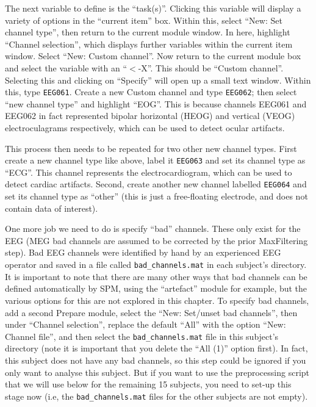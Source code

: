 The next variable to define is the ``task(s)''. Clicking this variable will display a variety of options in the ``current item'' box. Within this, select ``New: Set channel type'', then return to the current module window. In here, highlight ``Channel selection'', which displays further variables within the current item window. Select ``New: Custom channel''. Now return to the current module box and select the variable with an ``\(<\)-X''. This should be ``Custom channel''. Selecting this and clicking on ``Specify'' will open up a small text window. Within this, type \texttt{EEG061}. Create a new Custom channel and type \texttt{EEG062}; then select ``new channel type'' and highlight ``EOG''. This is because channels EEG061 and EEG062 in fact represented bipolar horizontal (HEOG) and vertical (VEOG) electroculagrams respectively, which can be used to detect ocular artifacts.

This process then needs to be repeated for two other new channel types. First create a new channel type like above, label it \texttt{EEG063} and set its channel type as ``ECG''. This channel represents the electrocardiogram, which can be used to detect cardiac artifacts. Second, create another new channel labelled \texttt{EEG064} and set its channel type as ``other'' (this is just a free-floating electrode, and does not contain data of interest).

One more job we need to do is specify ``bad'' channels. These only exist for the EEG (MEG bad channels are assumed to be corrected by the prior MaxFiltering step). Bad EEG channels were identified by hand by an experienced EEG operator and saved in a file called \texttt{bad\_channels.mat} in each subject's directory. It is important to note that there are many other ways that bad channels can be defined automatically by SPM, using the ``artefact'' module for example, but the various options for this are not explored in this chapter. To specify bad channels, add a second Prepare module, select the ``New: Set/unset bad channels'', then under ``Channel selection'', replace the default ``All'' with the option ``New: Channel file'', and then select the \texttt{bad\_channels.mat} file in this subject's directory (note it is important that you delete the ``All (1)'' option first). In fact, this subject does not have any bad channels, so this step could be ignored if you only want to analyse this subject. But if you want to use the preprocessing script that we will use below for the remaining 15 subjects, you need to set-up this stage now (i.e, the \texttt{bad\_channels.mat} files for the other subjects are not empty).

